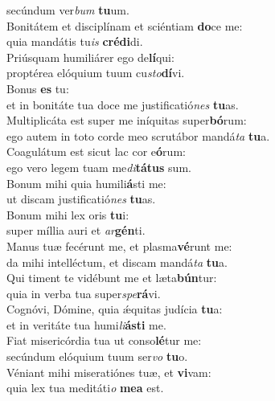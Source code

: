 \oddverse secúndum ver\textit{bum} \textbf{tu}um.\\
\evenverse Bonitátem et disciplínam et sciéntiam \textbf{do}ce me:~\*\\
\evenverse quia mandátis tu\textit{is} \textbf{cré}\textbf{di}di.\\
\oddverse Priúsquam humiliárer ego de\textbf{lí}qui:~\*\\
\oddverse proptérea elóquium tuum cu\textit{sto}\textbf{dí}vi.\\
\evenverse Bonus \textbf{es} tu:~\*\\
\evenverse et in bonitáte tua doce me justificatió\textit{nes} \textbf{tu}as.\\
\oddverse Multiplicáta est super me iníquitas super\textbf{bó}rum:~\*\\
\oddverse ego autem in toto corde meo scrutábor mandá\textit{ta} \textbf{tu}a.\\
\evenverse Coagulátum est sicut lac cor e\textbf{ó}rum:~\*\\
\evenverse ego vero legem tuam me\textit{di}\textbf{tá}\textbf{tus} sum.\\
\oddverse Bonum mihi quia humili\textbf{á}sti me:~\*\\
\oddverse ut discam justificatió\textit{nes} \textbf{tu}as.\\
\evenverse Bonum mihi lex oris \textbf{tu}i:~\*\\
\evenverse super míllia auri et \textit{ar}\textbf{gén}ti.\\
\oddverse Manus tuæ fecérunt me, et plasma\textbf{vé}runt me:~\*\\
\oddverse da mihi intelléctum, et discam mandá\textit{ta} \textbf{tu}a.\\
\evenverse Qui timent te vidébunt me et læta\textbf{bún}tur:~\*\\
\evenverse quia in verba tua super\textit{spe}\textbf{rá}vi.\\
\oddverse Cognóvi, Dómine, quia ǽquitas judícia \textbf{tu}a:~\*\\
\oddverse et in veritáte tua humi\textit{li}\textbf{á}\textbf{sti} me.\\
\evenverse Fiat misericórdia tua ut conso\textbf{lé}tur me:~\*\\
\evenverse secúndum elóquium tuum ser\textit{vo} \textbf{tu}o.\\
\oddverse Véniant mihi miseratiónes tuæ, et \textbf{vi}vam:~\*\\
\oddverse quia lex tua meditáti\textit{o} \textbf{me}\textbf{a} est.\\
